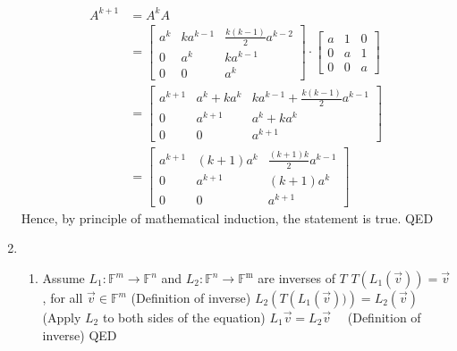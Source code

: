 \documentclass[11pt]{article}
\begin{document}
\begin{enumerate}[{\bf Q1.}]
			$$
			\begin{aligned}
			A^{k+1} & =A^k A \\
			& =\left[\begin{array}{ccc}
			a^k & k a^{k-1} & \frac{k(k-1)}{2} a^{k-2} \\
			0 & a^k & k a^{k-1} \\
			0 & 0 & a^k
			\end{array}\right] \cdot\left[\begin{array}{ccc}
			a & 1 & 0 \\
			0 & a & 1 \\
			0 & 0 & a
			\end{array}\right] \\
			& =\left[\begin{array}{ccc}
			a^{k+1} & a^k+k a^k & k a^{k-1}+\frac{k(k-1)}{2} a^{k-1} \\
			0 & a^{k+1} & a^k+k a^k \\
			0 & 0 & a^{k+1}
			\end{array}\right] \\
			& =\left[\begin{array}{ccc}
			a^{k+1} & (k+1) a^k & \frac{(k+1) k}{2} a^{k-1} \\
			0 & a^{k+1} & (k+1) a^k \\
			0 & 0 & a^{k+1}
			\end{array}\right]
			\end{aligned}
			$$
			Hence, by principle of mathematical induction, the statement is true. \newline
			QED
		\newpage
		
		\item 
		\begin{enumerate}
			\item 
			Assume $L_1: \mathbb{F}^m \rightarrow \mathbb{F}^n$ and $L_2: \mathbb{F}^{n} \rightarrow \mathbb{F}^{\text {m}}$ are inverses of $T$ \newline
			$T\left(L_1(\vec{v})\right)=\vec{v}$, for all $\vec{v} \in \mathbb{F}^m$ (Definition of inverse) \newline
			$L_2\left(T\left(L_1(\vec{v}))\right)=L_2(\vec{v})\right.$ (Apply $L_2$ to both sides of the equation) \newline
			$L_1 \vec{v}=L_2 \vec{v} \quad$ (Definition of inverse) \newline
			QED \newline


\end{enumerate}
\end{enumerate}
\end{document}
